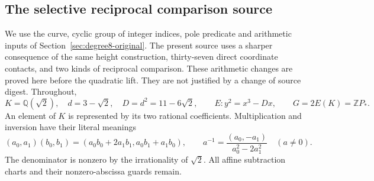 \documentclass[11pt]{article}
\theoremstyle{definition}
\theoremstyle{remark}
\newcommand{\Q}{\mathbb Q}
\newcommand{\Z}{\mathbb Z}
\begin{document}
\subsection{The selective reciprocal comparison source}
\label{subsec:quartic-source}
We use the curve, cyclic group of integer indices, pole predicate and
arithmetic inputs of Section~\ref{sec:degree8-original}. The present
source uses a sharper consequence of the same height construction,
thirty-seven direct coordinate contacts, and two kinds of reciprocal
comparison. These arithmetic changes are proved here before the
quadratic lift. They are not justified by a change of source digest.
Throughout,
\[
 K=\Q(\sqrt2),\quad d=3-\sqrt2,\quad D=d^2=11-6\sqrt2,
 \qquad E:y^2=x^3-Dx,\qquad G=2E(K)=\Z P_*.
\]
An element of $K$ is represented by its two rational coefficients.
Multiplication and inversion have their literal meanings
\[
 (a_0,a_1)(b_0,b_1)=(a_0b_0+2a_1b_1,a_0b_1+a_1b_0),\qquad
 a^{-1}=\frac{(a_0,-a_1)}{a_0^2-2a_1^2}\quad(a\ne0).
\]
The denominator is nonzero by the irrationality of $\sqrt2$.
All affine subtraction charts and their nonzero-abscissa guards remain.
\end{document}
